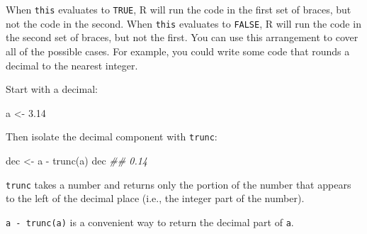\documentclass[
  letterpaper,
  DIV=11,
  numbers=noendperiod]{scrbook}
\newenvironment{Shaded}{\begin{snugshade}}{\end{snugshade}}
\newcommand{\DocumentationTok}[1]{\textcolor[rgb]{0.37,0.37,0.37}{\textit{#1}}}
\newcommand{\FloatTok}[1]{\textcolor[rgb]{0.68,0.00,0.00}{#1}}
\newcommand{\FunctionTok}[1]{\textcolor[rgb]{0.28,0.35,0.67}{#1}}
\newcommand{\NormalTok}[1]{\textcolor[rgb]{0.00,0.23,0.31}{#1}}
\newcommand{\OtherTok}[1]{\textcolor[rgb]{0.00,0.23,0.31}{#1}}
\newcommand{\SpecialCharTok}[1]{\textcolor[rgb]{0.37,0.37,0.37}{#1}}
\begin{document}
When \texttt{this} evaluates to \texttt{TRUE}, R will run the code in
the first set of braces, but not the code in the second. When
\texttt{this} evaluates to \texttt{FALSE}, R will run the code in the
second set of braces, but not the first. You can use this arrangement to
cover all of the possible cases. For example, you could write some code
that rounds a decimal to the nearest integer.

Start with a decimal:

\begin{Shaded}
\begin{Highlighting}[]
\NormalTok{a }\OtherTok{\textless{}{-}} \FloatTok{3.14}
\end{Highlighting}
\end{Shaded}

Then isolate the decimal component with \texttt{trunc}:

\begin{Shaded}
\begin{Highlighting}[]
\NormalTok{dec }\OtherTok{\textless{}{-}}\NormalTok{ a }\SpecialCharTok{{-}} \FunctionTok{trunc}\NormalTok{(a)}
\NormalTok{dec}
\DocumentationTok{\#\# 0.14}
\end{Highlighting}
\end{Shaded}

\begin{tcolorbox}[enhanced jigsaw, breakable, colback=white, colbacktitle=quarto-callout-note-color!10!white, arc=.35mm, bottomrule=.15mm, coltitle=black, left=2mm, rightrule=.15mm, colframe=quarto-callout-note-color-frame, leftrule=.75mm, opacitybacktitle=0.6, bottomtitle=1mm, toptitle=1mm, titlerule=0mm, opacityback=0, title=\textcolor{quarto-callout-note-color}{\faInfo}\hspace{0.5em}{Note}, toprule=.15mm]

\texttt{trunc} takes a number and returns only the portion of the number
that appears to the left of the decimal place (i.e., the integer part of
the number).

\end{tcolorbox}

\begin{tcolorbox}[enhanced jigsaw, breakable, colback=white, colbacktitle=quarto-callout-note-color!10!white, arc=.35mm, bottomrule=.15mm, coltitle=black, left=2mm, rightrule=.15mm, colframe=quarto-callout-note-color-frame, leftrule=.75mm, opacitybacktitle=0.6, bottomtitle=1mm, toptitle=1mm, titlerule=0mm, opacityback=0, title=\textcolor{quarto-callout-note-color}{\faInfo}\hspace{0.5em}{Note}, toprule=.15mm]

\texttt{a\ -\ trunc(a)} is a convenient way to return the decimal part
of \texttt{a}.

\end{tcolorbox}
\end{document}
